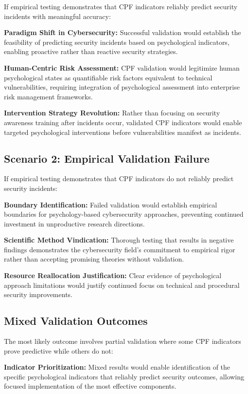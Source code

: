 \documentclass[11pt,a4paper]{article}
\begin{document}
If empirical testing demonstrates that CPF indicators reliably predict security incidents with meaningful accuracy:

\textbf{Paradigm Shift in Cybersecurity:} Successful validation would establish the feasibility of predicting security incidents based on psychological indicators, enabling proactive rather than reactive security strategies.

\textbf{Human-Centric Risk Assessment:} CPF validation would legitimize human psychological states as quantifiable risk factors equivalent to technical vulnerabilities, requiring integration of psychological assessment into enterprise risk management frameworks.

\textbf{Intervention Strategy Revolution:} Rather than focusing on security awareness training after incidents occur, validated CPF indicators would enable targeted psychological interventions before vulnerabilities manifest as incidents.

\subsection{Scenario 2: Empirical Validation Failure}

If empirical testing demonstrates that CPF indicators do not reliably predict security incidents:

\textbf{Boundary Identification:} Failed validation would establish empirical boundaries for psychology-based cybersecurity approaches, preventing continued investment in unproductive research directions.

\textbf{Scientific Method Vindication:} Thorough testing that results in negative findings demonstrates the cybersecurity field's commitment to empirical rigor rather than accepting promising theories without validation.

\textbf{Resource Reallocation Justification:} Clear evidence of psychological approach limitations would justify continued focus on technical and procedural security improvements.

\subsection{Mixed Validation Outcomes}

The most likely outcome involves partial validation where some CPF indicators prove predictive while others do not:

\textbf{Indicator Prioritization:} Mixed results would enable identification of the specific psychological indicators that reliably predict security outcomes, allowing focused implementation of the most effective components.
\end{document}
